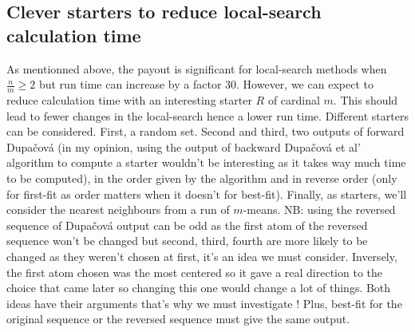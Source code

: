 \documentclass{amsart}
\begin{document}
\subsection{Clever starters to reduce local-search calculation time}
As mentionned above, the payout is significant for local-search methods when $\frac{n}{m}\geq2$ but run time can increase by a factor 30. However, we can expect to reduce calculation time with an interesting starter $R$ of cardinal $m$. This should lead to fewer changes in the local-search hence a lower run time. Different starters can be considered. First, a random set. Second and third, two outputs of forward Dupačová (in my opinion, using the output of backward Dupačová et al' algorithm to compute a starter wouldn't be interesting as it takes way much time to be computed), in the order given by the algorithm and in reverse order (only for first-fit as order matters when it doesn't for best-fit). Finally, as starters, we'll consider the nearest neighbours from a run of $m$-means. 
\newline
NB: using the reversed sequence of Dupačová output can be odd as the first atom of the reversed sequence won't be changed but second, third, fourth are more likely to be changed as they weren't chosen at first, it's an idea we must consider. Inversely, the first atom chosen was the most centered so it gave a real direction to the choice that came later so changing this one would change a lot of things. Both ideas have their arguments that's why we must investigate ! Plus, best-fit for the original sequence or the reversed sequence must give the same output.
\end{document}
